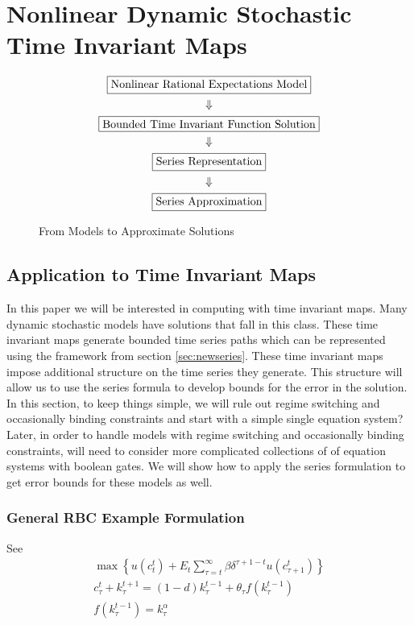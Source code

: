 \documentclass[12pt]{article}
\begin{document}
\section{Nonlinear Dynamic Stochastic Time Invariant Maps}

\begin{figure}
  \centering
  


  \begin{gather}
    \fbox{Nonlinear Rational Expectations Model}\\ \Downarrow\\
\fbox{Bounded Time Invariant Function Solution}\\\Downarrow\\
\fbox{Series Representation}\\\Downarrow\\
\fbox{Series Approximation}
  \end{gather}
  \caption{From Models to Approximate Solutions}
  \label{fig:modelsto}
\end{figure}



\subsection{Application to Time Invariant Maps}
\label{sec:extToMaps}

In this paper we will be interested in computing with time
 invariant maps. Many dynamic stochastic models have solutions that fall in this class. 
These time invariant maps generate  bounded time series paths which can
be represented using the framework from section \ref{sec:newseries}.
These time invariant maps impose additional structure on the time 
series they generate.  This structure will allow us to use the series formula to
develop bounds for the error in the solution.
In this section, to keep things simple, we will rule out regime switching and occasionally binding constraints and start
 with  a simple single equation system?
Later, in order to handle models with regime switching and occasionally binding constraints, will need to consider more complicated collections of 
of equation systems with  boolean gates. We will show how to apply the 
series formulation to get error bounds for these models as well.



\subsubsection{ General RBC Example Formulation}
\label{sec:rbcaux}
  See \cite{Maliar2005}
 \begin{gather*}
   \max\left \{  u(c_t^t) + E_t \sum_{\tau=t}^\infty \beta \delta^{\tau+1-t}u(c_{\tau+1}^t)\right \}\\
c_\tau^t + k_\tau^{t+1}=(1-d)k_\tau^{t-1} + \theta_\tau f(k_\tau^{t-1})\\
f(k_\tau^{t-1})= k_\tau^\alpha
 \end{gather*}
\end{document}
